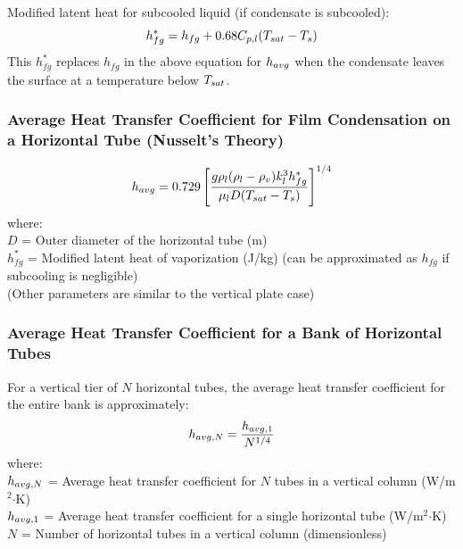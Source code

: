 Modified latent heat for subcooled liquid (if condensate is subcooled):
\begin{equation}
    h_{fg}^* = h_{fg} + 0.68 C_{p,l} (T_{sat} - T_s)
\end{equation}
This $h_{fg}^*$ replaces $h_{fg}$ in the above equation for $h_{avg}$ when the condensate leaves the surface at a temperature below $T_{sat}$.

\subsubsection*{Average Heat Transfer Coefficient for Film Condensation on a Horizontal Tube (Nusselt's Theory)}
\begin{equation}
    h_{avg} = 0.729 \left[ \frac{g \rho_l (\rho_l - \rho_v) k_l^3 h_{fg}^*}{\mu_l D (T_{sat} - T_s)} \right]^{1/4}
\end{equation}
where: \\
$D$ = Outer diameter of the horizontal tube (m) \\
$h_{fg}^*$ = Modified latent heat of vaporization (J/kg) (can be approximated as $h_{fg}$ if subcooling is negligible) \\
(Other parameters are similar to the vertical plate case)

\subsubsection*{Average Heat Transfer Coefficient for a Bank of Horizontal Tubes}
For a vertical tier of $N$ horizontal tubes, the average heat transfer coefficient for the entire bank is approximately:
\begin{equation}
    h_{avg,N} = \frac{h_{avg,1}}{N^{1/4}}
\end{equation}
where: \\
$h_{avg,N}$ = Average heat transfer coefficient for $N$ tubes in a vertical column (W/m$^2$$\cdot$K) \\
$h_{avg,1}$ = Average heat transfer coefficient for a single horizontal tube (W/m$^2$$\cdot$K) \\
$N$ = Number of horizontal tubes in a vertical column (dimensionless)
